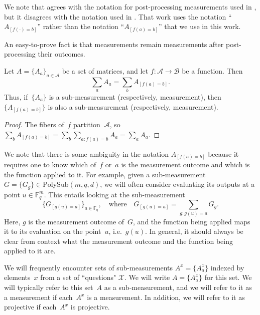 \documentclass[11pt]{article}
\theoremstyle{definition}
\newcommand{\F}{\mathbb F}
\newcommand{\calA}{\mathcal{A}}
\newcommand{\calB}{\mathcal{B}}
\newcommand{\calX}{\mathcal{X}}
\newcommand{\polysub}[3]{\mathrm{PolySub}(#1, #2, #3)}
\begin{document}
\begin{remark}
We note that 
agrees with the notation for post-processing measurements
used in \cite{NW19},
but it disagrees with the notation used in \cite{JNV+20}.
That work uses the notation ``$A_{[f(\cdot)=b]}$'' rather
than the notation ``$A_{[f(a)=b]}$'' that we use in this work.
\end{remark}

An easy-to-prove fact is that measurements remain measurements after post-processing their outcomes.

\begin{proposition}
Let $A = \{A_a\}_{a \in \calA}$ be a set of matrices,
and let $f:\calA \rightarrow \calB$ be a function.
Then
\begin{equation*}
\sum_a A_a = \sum_b A_{[f(a)=b]}.
\end{equation*}
Thus, if~$\{A_a\}$ is a sub-measurement (respectively, measurement),
then~$\{A_{[f(a)=b]}\}$ is also a sub-measurement (respectively, measurement).
\end{proposition}
\begin{proof}
The fibers of~$f$ partition~$\calA$, so
$\sum_bA_{[f(a)=b]}=\sum_b\sum_{a:f(a)=b}A_a=\sum_aA_a$.
\end{proof}

\begin{remark}
We note that there is some ambiguity in the notation $A_{[f(a)=b]}$
because it requires one to know which of~$f$ or~$a$ is the measurement outcome
and which is the function applied to it.
For example, given a sub-measurement $G = \{G_g\} \in \polysub{m}{q}{d}$,
we will often consider evaluating its outputs at a point $u \in \F_q^m$.
This entails looking at the sub-measurement
\begin{equation*}
\{G_{[g(u)=a]}\}_{a \in \F_q},
\quad
\text{where}
\quad
G_{[g(u)=a]} = \sum_{g:g(u) = a} G_g.
\end{equation*}
Here, $g$ is the measurement outcome of~$G$,
and the function being applied maps it to its evaluation on the point~$u$, i.e.\ $g(u)$.
In general, it should always be clear from context
what the measurement outcome and the function being applied to it are.
\end{remark}

\begin{notation}
We will frequently encounter sets of sub-measurements $A^x= \{A^x_{a}\}$ indexed by elements~$x$ from a set of ``questions" $\calX$. We will write $A = \{A^x_a\}$ for this set.
We will typically refer to this set~$A$ as a sub-measurement,
and we will refer to it as a measurement if each~$A^x$ is a measurement.
In addition, we will refer to it as projective if each~$A^x$ is projective.
\end{notation}
\end{document}
